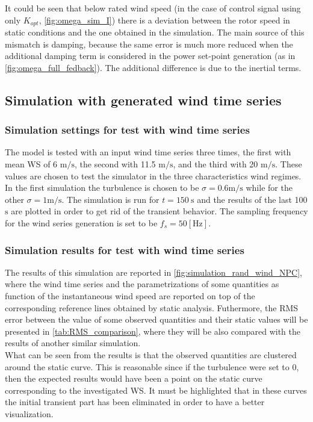

It could be seen that below rated wind speed (in the case of control signal using only $K_{opt}$, \autoref{fig:omega_sim_I}) there is a deviation between the rotor speed in static conditions and the one obtained in the simulation. The main source of this mismatch is damping, because the same error is much more reduced when the additional damping term is considered in the power set-point generation (as in \autoref{fig:omega_full_fedback}). The additional difference is due to the inertial terms. 

\subsection{Simulation with generated wind time series}\label{sec:wind_series_sim}
\subsubsection[Simulation settings]{Simulation settings for test with wind time series}
The model is tested with an input wind time series three times, the first with mean \acrshort{WS} of 6 $\si{\meter\per\second}$, the second with 11.5 $\si{\meter\per\second}$, and the third with 20 $\si{\meter\per\second}$. These values are chosen to test the simulator in the three characteristics wind regimes. In the first simulation the turbulence is chosen to be $\sigma=0.6 \si{\meter\per\second}$ while for the other $\sigma=1 \si{\meter\per\second}$. The simulation is run for $t=150\ \si{\second}$ and the results of the last 100 $\si{\second}$ are plotted in order to get rid of the transient behavior. The sampling frequency for the wind series generation is set to be $f_s=50 \left[\si{\hertz}\right]$.

\subsubsection[Simulation results]{Simulation results for test with wind time series}
The results of this simulation are reported in \autoref{fig:simulation_rand_wind_NPC}, where the wind time series and the parametrizations of some quantities as function of the instantaneous wind speed are reported on top of the corresponding reference lines obtained by static analysis. Futhermore, the \acrfull{RMS} error between the value of some observed quantities and their static values will be presented in \autoref{tab:RMS_comparison}, where they will be also compared with the results of another similar simulation. \\
What can be seen from the results is that the observed quantities are clustered around the static curve. This is reasonable since if the turbulence were set to 0, then the expected results would have been a point on the static curve corresponding to the investigated WS. It must be highlighted that in these curves the initial transient part has been eliminated in order to have a better visualization. 

